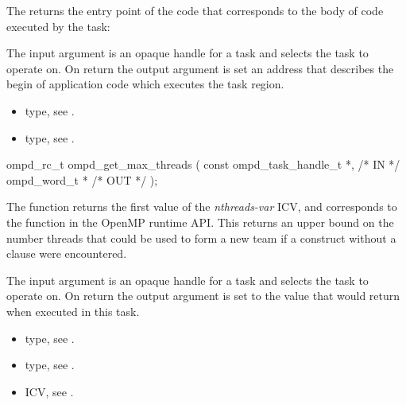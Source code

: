 \descr
The  returns the entry point of the code
that corresponds to the body of code executed by the task:

\argdesc
The input argument  is an opaque handle for a task and selects the task to operate on.
On return the output argument  is set an address that describes the begin of application
code which executes the task region.

\crossreferences
\begin{itemize}
	\item {} type, see .
	\item {} type, see .
\end{itemize}


\summary

\format
\cspecificstart
\begin{boxedcode}
ompd\_rc\_t ompd\_get\_max\_threads (
  const ompd\_task\_handle\_t  *,                           /* IN */
  ompd\_word\_t              *                                   /* OUT */
); 
\end{boxedcode}
\cspecificend

\descr
The  function returns the first value of the
 \emph{nthreads-var} ICV,
and corresponds to the  function
in the OpenMP runtime API.
This returns an upper bound on the number threads that could be used
to form a new team if a  construct without a
 clause were encountered.

\argdesc
The input argument  is an opaque handle for a task and selects the task to operate on.
On return the output argument  is set to the value that  would return when
executed in this task.

\crossreferences
\begin{itemize}
	\item {} type, see .
	\item {} type, see .
	\item {} ICV, see .
\end{itemize}

